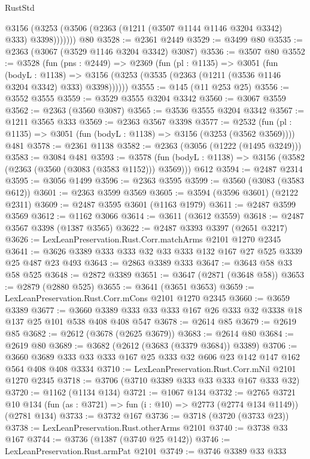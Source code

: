 \begin{lexlean}{RustStd}
\begin{coremodule}
          @3156 (@3253 (@3506 (@2363 (@1211 (@3507 @1144 @1146 @3204 @3342) @333) @3398)))))))
    @80
@3528 := @2361 @2449
@3529 := @3499 @80
@3535 := @2363 (@3067 (@3529 @1146 @3204 @3342) @3087)
@3536 := @3507 @80
@3552 := @3528
    (fun (pns : @2449) =>
    @2369
      (fun (pl : @1135) =>
      @3051
        (fun (bodyL : @1138) =>
        @3156 (@3253 (@3535 (@2363 (@1211 (@3536 @1146 @3204 @3342) @333) @3398))))))
@3555 := @145 (@11 @253 @25)
@3556 := @3552 @3555
@3559 := @3529 @3555 @3204 @3342
@3560 := @3067 @3559
@3562 := @2363 (@3560 @3087)
@3565 := @3536 @3555 @3204 @3342
@3567 := @1211 @3565 @333
@3569 := @2363 @3567 @3398
@3577 := @2532 (fun (pl : @1135) => @3051 (fun (bodyL : @1138) => @3156 (@3253 (@3562 @3569)))) @481
@3578 := @2361 @1138
@3582 := @2363 (@3056 (@1222 (@1495 @3249)))
@3583 := @3084 @481
@3593 := @3578
    (fun (bodyL : @1138) => @3156 (@3582 (@2363 (@3560 (@3083 (@3583 @1152))) @3569)))
    @612
@3594 := @2487 @2314
@3595 := @3056 @1499
@3596 := @2363 @3595
@3599 := @3560 (@3083 (@3583 @612))
@3601 := @2363 @3599 @3569
@3605 := @3594 (@3596 @3601) (@2122 @2311)
@3609 := @2487 @3595 @3601 (@1163 @1979)
@3611 := @2487 @3599 @3569
@3612 := @1162 @3066
@3614 := @3611 (@3612 @3559)
@3618 := @2487 @3567 @3398 (@1387 @3565)
@3622 := @2487 @3393 @3397 (@2651 @3217)
@3626 := LexLeanPreservation.Rust.Corr.matchArms @2101 @1270 @2345
@3641 := @3626 @3389 @333 @333 @32 @33 @333 @132 @167 @27 @525 @3339 @25 @487 @23 @493
@3643 := @2863 @3389 @333
@3647 := @3643 @58 @33 @58 @525
@3648 := @2872 @3389
@3651 := @3647 (@2871 (@3648 @58))
@3653 := @2879 (@2880 @525)
@3655 := @3641 (@3651 @3653)
@3659 := LexLeanPreservation.Rust.Corr.mCons @2101 @1270 @2345
@3660 := @3659 @3389
@3677 := @3660 @3389 @333 @33 @333 @167 @26 @333 @32 @3338 @18 @137 @25 @101 @538 @408 @408 @547
@3678 := @2614 @85
@3679 := @2619 @85
@3682 := @2612 (@3678 (@2625 @3679))
@3683 := @2614 @80
@3684 := @2619 @80
@3689 := @3682 (@2612 (@3683 (@3379 @3684)) @3389)
@3706 := @3660 @3689 @333 @33 @333 @167 @25 @333 @32 @606 @23 @142 @147 @162 @564 @408 @408 @3334
@3710 := LexLeanPreservation.Rust.Corr.mNil @2101 @1270 @2345
@3718 := @3706 (@3710 @3389 @333 @33 @333 @167 @333 @32)
@3720 := @1162 (@1134 @134)
@3721 := @1067 @134
@3732 := @2765
    @3721
    @10
    @134
    (fun (as : @3721) => fun (i : @10) => @2773 (@2774 @134 @1149))
    (@2781 @134)
@3733 := @3732 @167
@3736 := @3718 (@3720 (@3733 @23))
@3738 := LexLeanPreservation.Rust.otherArms @2101
@3740 := @3738 @33 @167
@3744 := @3736 (@1387 (@3740 @25 @142))
@3746 := LexLeanPreservation.Rust.armPat @2101
@3749 := @3746 @3389 @33 @333

\end{coremodule}
\end{lexlean}

